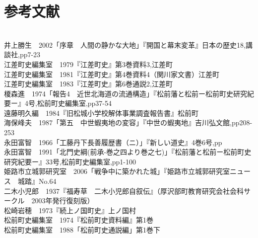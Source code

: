 \documentclass[11pt,report]{jsbook}
\begin{document}
\chapter{参考文献}
\mbox{}\\
井上勝生　2002「序章　人間の静かな大地」『開国と幕末変革』日本の歴史18,講談社,pp7-23\\
江差町史編集室　1979『江差町史』第3巻資料3,江差町\\
江差町史編集室　1981『江差町史』第4巻資料4（関川家文書）江差町\\
江差町史編集室　1983『江差町史』第6巻通説2,江差町\\
榎森進　1974「報告4　近世北海道の流通構造」『松前藩と松前ー松前町史研究紀要ー』4号,松前町史編集室,pp37-54\\
遠藤明久編　1984『旧松城小学校解体事業調査報告書』松前町\\
海保峰夫　1987「第五　中世蝦夷地の変容」『中世の蝦夷地』吉川弘文館,pp208-253	\\
永田富智　1966「工藤丹下長善履歴書（ニ）」『新しい道史』4巻6号,pp\\
永田富智　1991「北門史綱(前承-巻之四より巻之七)」『松前藩と松前ー松前町史研究紀要ー』33号,松前町史編集室,pp1-100\\
姫路市立城郭研究室　2006「戦争中に築かれた城」『姫路市立城郭研究室ニュース　城踏』No.64\\
二木小児郎　1937『福寿草　二木小児郎自叙伝』（厚沢部町教育研究会社会科サークル　2003年発行復刻版）\\
松崎岩穂　1973『続上ノ国町史』上ノ国村\\
松前町史編集室　1974『松前町史資料編』第1巻\\
松前町史編集室　1988「松前町史通説編」第1巻下\\
\end{document}
